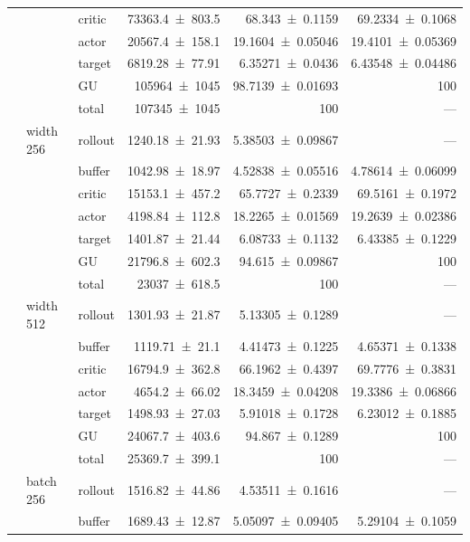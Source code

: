 {\begin{longtable}{@{}lllrrr@{}}
     &  & critic & \num{73363.4+-803.5} & \num{68.343+-0.1159} & \num{69.2334+-0.1068} \\
     &  & actor & \num{20567.4+-158.1} & \num{19.1604+-0.05046} & \num{19.4101+-0.05369} \\
     &  & target & \num{6819.28+-77.91} & \num{6.35271+-0.0436} & \num{6.43548+-0.04486} \\
     &  & GU & \num{105964+-1045} & \num{98.7139+-0.01693} & 100 \\
     &  & total & \num{107345+-1045} & \num{100} & --- \\
    \addlinespace[2pt]
     & width 256 & rollout & \num{1240.18+-21.93} & \num{5.38503+-0.09867} & --- \\
     &  & buffer & \num{1042.98+-18.97} & \num{4.52838+-0.05516} & \num{4.78614+-0.06099} \\
     &  & critic & \num{15153.1+-457.2} & \num{65.7727+-0.2339} & \num{69.5161+-0.1972} \\
     &  & actor & \num{4198.84+-112.8} & \num{18.2265+-0.01569} & \num{19.2639+-0.02386} \\
     &  & target & \num{1401.87+-21.44} & \num{6.08733+-0.1132} & \num{6.43385+-0.1229} \\
     &  & GU & \num{21796.8+-602.3} & \num{94.615+-0.09867} & 100 \\
     &  & total & \num{23037+-618.5} & \num{100} & --- \\
    \addlinespace[2pt]
     & width 512 & rollout & \num{1301.93+-21.87} & \num{5.13305+-0.1289} & --- \\
     &  & buffer & \num{1119.71+-21.1} & \num{4.41473+-0.1225} & \num{4.65371+-0.1338} \\
     &  & critic & \num{16794.9+-362.8} & \num{66.1962+-0.4397} & \num{69.7776+-0.3831} \\
     &  & actor & \num{4654.2+-66.02} & \num{18.3459+-0.04208} & \num{19.3386+-0.06866} \\
     &  & target & \num{1498.93+-27.03} & \num{5.91018+-0.1728} & \num{6.23012+-0.1885} \\
     &  & GU & \num{24067.7+-403.6} & \num{94.867+-0.1289} & 100 \\
     &  & total & \num{25369.7+-399.1} & \num{100} & --- \\
    \addlinespace[2pt]
     & batch 256 & rollout & \num{1516.82+-44.86} & \num{4.53511+-0.1616} & --- \\
     &  & buffer & \num{1689.43+-12.87} & \num{5.05097+-0.09405} & \num{5.29104+-0.1059} \\

\end{longtable}}

